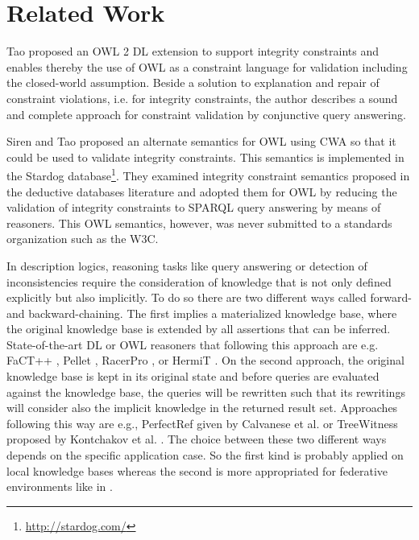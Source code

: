 \documentclass{llncs}
\begin{document}
\section{Related Work}

Tao \cite{tao2012integrity} proposed an OWL 2 DL extension to support integrity constraints and enables thereby the use of OWL as a constraint language for validation including the closed-world assumption. Beside a solution to explanation and repair of constraint violations, i.e. for integrity constraints, the author describes a sound and complete approach for constraint validation by conjunctive query answering.

Siren and Tao proposed an alternate semantics for OWL using CWA so that it could be used to validate integrity constraints.
This semantics is implemented in the Stardog database\footnote{\url{http://stardog.com/}}\cite{SirinTao2009}. 
They examined integrity constraint semantics proposed in the deductive databases literature and adopted them for OWL
by reducing the validation of integrity constraints to SPARQL query answering by means of reasoners.
This OWL semantics, however, was never submitted to a standards organization such as the W3C.

In description logics, reasoning tasks like query answering or detection of inconsistencies require the consideration of knowledge that is not only defined explicitly but also implicitly. To do so there are two different ways called forward- and backward-chaining. The first implies a materialized knowledge base, where the original knowledge base is extended by all assertions that can be inferred. State-of-the-art DL or OWL reasoners that following this approach are e.g. FaCT++ \cite{tsarkov2006fact++}, Pellet \cite{sirin2007pellet},  RacerPro \cite{haarslev2001racer}, or HermiT \cite{horrocks2012hermit}. On the second approach, the original knowledge base is kept in its original state and before queries are evaluated against the knowledge base, the queries will be rewritten such that its rewritings will consider also the implicit knowledge in the returned result set. Approaches following this way are e.g., \textsf{PerfectRef} given by Calvanese et al. \cite{Calvanese2007} or \textsf{TreeWitness} proposed by Kontchakov et al. \cite{kontchakov2011combined}. The choice between these two different ways depends on the specific application case. So the first kind is probably applied on local knowledge bases whereas the second is more appropriated for federative environments like in \cite{nolle2014efficient,nolle2013elite}.
\end{document}
